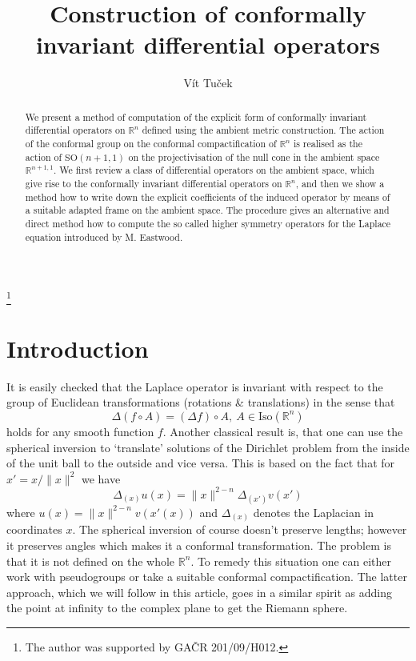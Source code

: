 \documentclass[final]{birkmult}
\theoremstyle{definition}
\theoremstyle{remark}
\numberwithin{equation}{section}
\newcommand{\lap}{\Delta}
\begin{document}
\title{Construction of conformally invariant differential operators}
\author{V\'it Tu\v{c}ek}
\address{M\'UUK\\ Sokolovsk\'a 49/83\\Praha\\186 00}

\begin{abstract}
We present a method of computation of the explicit form of conformally invariant differential operators on $\mathbb{R}^n$ defined using the ambient metric construction. The action of the conformal group on the conformal compactification of $\mathbb{R}^n$ is realised as the action of $\mathrm{SO}(n+1,1)$ on the projectivisation of the null cone in the ambient space $\mathbb{R}^{n+1,1}$. We first review a class of differential operators on the ambient space, which give rise to the conformally invariant differential operators on $\mathbb{R}^n$, and then we show a method how to write down the explicit coefficients of the induced operator by means of a suitable adapted frame on the ambient space. The procedure gives an alternative and direct method how to compute the so called higher symmetry operators for the Laplace equation introduced by M. Eastwood.
\end{abstract}

\thanks{The author was supported by GA\v{C}R 201/09/H012.}

\maketitle


\section{Introduction}
  It is easily checked that the Laplace operator is invariant with respect to the group of Euclidean transformations (rotations \& translations) in the sense that
  \[ \lap (f\circ A) = (\lap f)\circ A,\ A\in \mathrm{Iso}(\mathbb{R}^n) \]
  holds for any smooth function $f$. Another classical result is, that one can use the spherical inversion to `translate' solutions of the Dirichlet problem from the inside of the unit ball to the outside and vice versa. This is based on the fact that for $x' = x/\|x\|^2$ we have 
  \[ \lap_{(x)} u(x) = \|x\|^{2-n}\lap_{(x')}v(x') \]
  where $u(x) =  \|x\|^{2-n}v(x'(x))$ and $\lap_{(x)}$ denotes the Laplacian in coordinates $x$. %
  The spherical inversion of course doesn't preserve lengths; however it preserves angles which makes it a conformal transformation. The problem is that it is not defined on the whole $\mathbb{R}^n$. To remedy this situation one can either work with pseudogroups or take a suitable conformal compactification. The latter approach, which we will follow in this article, goes in a similar spirit as adding the point at infinity to the complex plane to get the Riemann sphere. 
\end{document}
